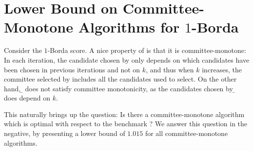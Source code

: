 \section{Lower Bound on Committee-Monotone Algorithms for $1$-Borda}
\label{sec:monotone}
Consider the $1$-Borda score. A nice property of \g{} is that it is committee-monotone: In each iteration, the candidate chosen by \g{} only depends on which candidates have been chosen in previous iterations and not on $k$, and thus when $k$ increases, the committee selected by \g{} includes all the candidates \g{} used to select. On the other hand, \b{} does not satisfy committee monotonicity, as the candidates chosen by \b{} does depend on $k$.

This naturally brings up the question: Is there a committee-monotone algorithm which is optimal with respect to the benchmark \rand{}? We answer this question in the negative, by presenting a lower bound of $1.015$ for all committee-monotone algorithms.


